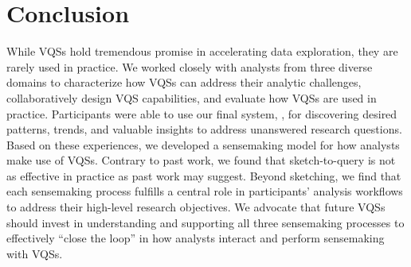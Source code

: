  \section{Conclusion\label{sec:conclusion}}
 While VQSs hold tremendous promise in accelerating data exploration, they are rarely used in practice. We worked closely with analysts from three diverse domains to characterize how VQSs can address their analytic challenges, collaboratively design VQS capabilities, and evaluate how VQSs are used in practice. Participants were able to use our final system, \zvpp, for discovering desired patterns, trends, and valuable insights to address unanswered research questions. Based on these experiences, we developed a sensemaking model for how analysts make use of VQSs. Contrary to past work, we found that sketch-to-query is not as effective in practice as past work may suggest. Beyond sketching, we find that each sensemaking process fulfills a central role in participants' analysis workflows to address their high-level research objectives. We advocate that future VQSs should invest in understanding and supporting all three sensemaking processes to effectively ``close the loop'' in how analysts interact and perform sensemaking with VQSs. 
